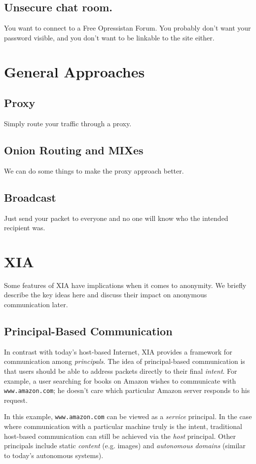 \documentclass{article}
\begin{document}
\subsection{Unsecure chat room.}
You want to connect to a Free Opressistan Forum.  You probably don't want your password visible, and you don't want to be linkable to the site either.


\section{General Approaches}
\subsection{Proxy}
Simply route your traffic through a proxy.
\subsection{Onion Routing and MIXes}
We can do some things to make the proxy approach better.
\subsection{Broadcast}
Just send your packet to everyone and no one will know who the intended recipient was.


\section{XIA}
\label{sec:xia-overview}
Some features of XIA have implications when it comes to anonymity. We briefly describe the key ideas here and discuss their impact on anonymous communication later.
\subsection{Principal-Based Communication}
In contrast with today's host-based Internet, XIA provides a framework for communication among \emph{principals}. The idea of principal-based communication is that users should be able to address packets directly to their final \emph{intent}. For example, a user searching for books on Amazon wishes to communicate with \texttt{www.amazon.com}; he doesn't care which particular Amazon server responds to his request.

In this example, \texttt{www.amazon.com} can be viewed as a \emph{service} principal. In the case where communication with a particular machine truly is the intent, traditional host-based communication can still be achieved via the \emph{host} principal. Other principals include static \emph{content} (e.g. images) and \emph{autonomous domains} (similar to today's autonomous systems).
\end{document}
